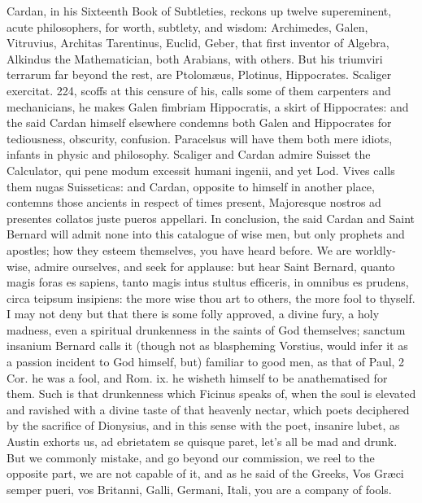 {Cardan, in his Sixteenth Book of Subtleties, reckons up twelve
supereminent, acute philosophers, for worth, subtlety, and wisdom:
Archimedes, Galen, Vitruvius, Architas Tarentinus, Euclid, Geber, that
first inventor of Algebra, Alkindus the Mathematician, both Arabians,
with others. But his triumviri terrarum far beyond the rest, are
Ptolom\ae{}us, Plotinus, Hippocrates. Scaliger exercitat. 224, scoffs at
this censure of his, calls some of them carpenters and mechanicians, he
makes Galen fimbriam Hippocratis, a skirt of Hippocrates: and the said
Cardan himself elsewhere condemns both Galen and Hippocrates for
tediousness, obscurity, confusion. Paracelsus will have them both mere
idiots, infants in physic and philosophy. Scaliger and Cardan admire
Suisset the Calculator, qui pene modum excessit humani ingenii, and yet
Lod. Vives calls them nugas Suisseticas: and Cardan, opposite to
himself in another place, contemns those ancients in respect of times
present, Majoresque nostros ad presentes collatos juste pueros
appellari. In conclusion, the said Cardan and Saint Bernard will
admit none into this catalogue of wise men, but only prophets and
apostles; how they esteem themselves, you have heard before. We are
worldly-wise, admire ourselves, and seek for applause: but hear Saint
Bernard, quanto magis foras es sapiens, tanto magis intus stultus
efficeris, \etc{} in omnibus es prudens, circa teipsum insipiens: the more
wise thou art to others, the more fool to thyself. I may not deny but
that there is some folly approved, a divine fury, a holy madness, even
a spiritual drunkenness in the saints of God themselves; sanctum
insanium Bernard calls it (though not as blaspheming Vorstius,
would infer it as a passion incident to God himself, but) familiar to
good men, as that of Paul, 2 Cor. he was a fool, \etc{} and Rom. ix. he
wisheth himself to be anathematised for them. Such is that drunkenness
which Ficinus speaks of, when the soul is elevated and ravished with a
divine taste of that heavenly nectar, which poets deciphered by the
sacrifice of Dionysius, and in this sense with the poet, insanire
lubet, as Austin exhorts us, ad ebrietatem se quisque paret, let's all
be mad and drunk. But we commonly mistake, and go beyond our
commission, we reel to the opposite part, we are not capable of
it, and as he said of the Greeks, Vos Gr\ae{}ci semper pueri, vos
Britanni, Galli, Germani, Itali, \etc{} you are a company of fools.

}
